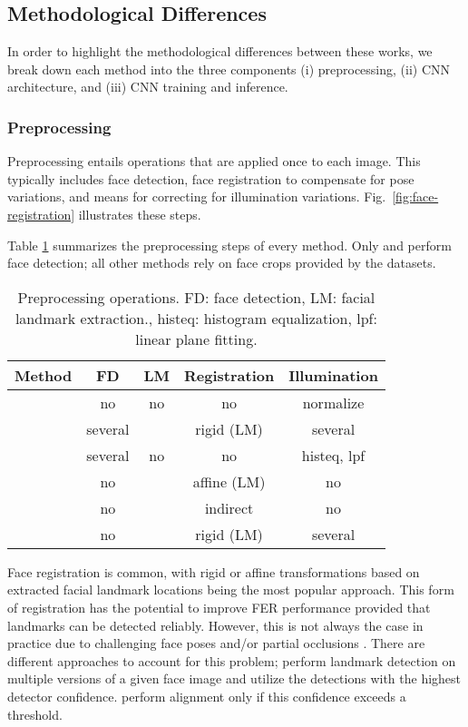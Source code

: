 \documentclass[conference,10pt,a4paper]{IEEEtran}
\begin{document}
\subsection{Methodological Differences} \label{sub:methodological_differences}

In order to highlight the methodological differences between these works, we break down each method into the three components (i) preprocessing, (ii) CNN architecture, and (iii) CNN training and inference.

\subsubsection{Preprocessing} \label{ssub:preprocessing}

Preprocessing entails operations that are applied once to each image. This typically includes face detection, face registration to compensate for pose variations, and means for correcting for illumination variations. Fig.~\ref{fig:face-registration} illustrates these steps.

Table \ref{tbl:sota_preprocessing} summarizes the preprocessing steps of every method. Only \cite{kim16} and \cite{yu15} perform face detection; all other methods rely on face crops provided by the datasets.

\begin{table}[t]
\centering
\caption{Preprocessing operations. FD: face detection, LM: facial landmark extraction., histeq: histogram equalization, lpf: linear plane fitting.}
\label{tbl:sota_preprocessing}
\begin{tabular}{ccccc}
    \toprule
    Method & FD & LM & Registration & Illumination \\ \midrule
    \cite{tang13} & no & no & no & normalize \\ 
    \cite{kim16} & several & \cite{xiong13} & rigid (LM) & several \\ 
    \cite{yu15} & several & no & no & histeq, lpf \\ 
    \cite{mollahosseini15} & no & \cite{xiong13} & affine (LM) & no \\ 
    \cite{zhang2015} & no & \cite{xiong13} & indirect & no \\ \cite{kim16cvpr} & no & \cite{xiong13} & rigid (LM) & several \\ \bottomrule
\end{tabular}
\end{table}

Face registration is common, with rigid or affine transformations based on extracted facial landmark locations being the most popular approach. This form of registration has the potential to improve FER performance \cite{kim16cvpr} provided that landmarks can be detected reliably. However, this is not always the case in practice due to challenging face poses and/or partial occlusions \cite{kim16cvpr}. There are different approaches to account for this problem; \cite{kim16} perform landmark detection on multiple versions of a given face image and utilize the detections with the highest detector confidence. \cite{kim16cvpr} perform alignment only if this confidence exceeds a threshold.
\end{document}
